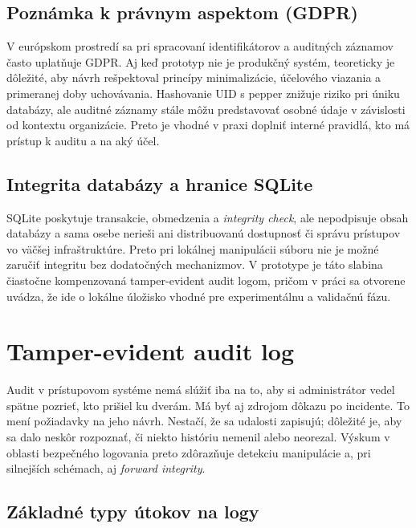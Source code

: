 \documentclass[journal,a4paper,onecolumn]{IEEEtran}
\begin{document}
\subsection{Poznámka k právnym aspektom (GDPR)}

V európskom prostredí sa pri spracovaní identifikátorov a auditných záznamov často uplatňuje GDPR. Aj keď prototyp nie je produkčný systém, teoreticky je dôležité, aby návrh rešpektoval princípy minimalizácie, účelového viazania a primeranej doby uchovávania. Hashovanie UID s pepper znižuje riziko pri úniku databázy, ale auditné záznamy stále môžu predstavovať osobné údaje v závislosti od kontextu organizácie. Preto je vhodné v praxi doplniť interné pravidlá, kto má prístup k auditu a na aký účel.


\subsection{Integrita databázy a hranice SQLite}

SQLite poskytuje transakcie, obmedzenia a \emph{integrity check}, ale nepodpisuje obsah databázy a sama osebe nerieši ani distribuovanú dostupnosť či správu prístupov vo väčšej infraštruktúre. Preto pri lokálnej manipulácii súboru nie je možné zaručiť integritu bez dodatočných mechanizmov. V prototype je táto slabina čiastočne kompenzovaná tamper-evident audit logom, pričom v práci sa otvorene uvádza, že ide o lokálne úložisko vhodné pre experimentálnu a validačnú fázu.

\section{Tamper-evident audit log}

Audit v prístupovom systéme nemá slúžiť iba na to, aby si administrátor vedel spätne pozrieť, kto prišiel ku dverám. Má byť aj zdrojom dôkazu po incidente. To mení požiadavky na jeho návrh. Nestačí, že sa udalosti zapisujú; dôležité je, aby sa dalo neskôr rozpoznať, či niekto históriu nemenil alebo neorezal. Výskum v oblasti bezpečného logovania preto zdôrazňuje detekciu manipulácie a, pri silnejších schémach, aj \emph{forward integrity}\cite{SchneierKelsey1999,NIST80092}.

\subsection{Základné typy útokov na logy}
\end{document}
